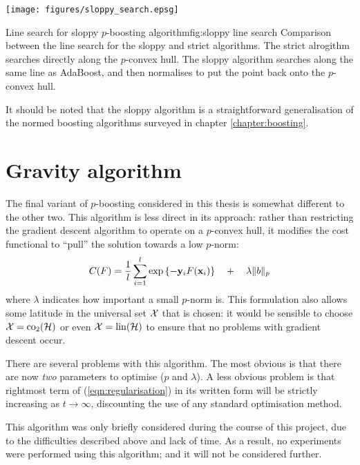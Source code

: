 \begin{linefigure}
\begin{center}
\texttt{[image: figures/sloppy\_search.epsg]}
\end{center}
\begin{capt}{Line search for sloppy $p$-boosting algorithm}{fig:sloppy line search}
Comparison between the line search for the sloppy and strict
algorithms.  The strict alrogithm searches directly along the
$p$-convex hull.  The sloppy algorithm searches along the same line as
AdaBoost, and then normalises to put the point back onto the
$p$-convex hull.
\end{capt}
\end{linefigure}

It should be noted that the sloppy algorithm is a straightforward
generalisation of the normed boosting algorithms surveyed in chapter
\ref{chapter:boosting}.


\section{Gravity algorithm}

The final variant of $p$-boosting considered in this thesis is
somewhat different to the other two.  This algorithm is less direct in
its approach: rather than restricting the gradient descent algorithm
to operate on a $p$-convex hull, it modifies the cost functional to
``pull'' the solution towards a low $p$-norm:
%
\begin{equation}
C(F) = \frac{1}{l} \sum_{i=1}^{l} \exp
\left\{ -\mathbf{y}_iF(\mathbf{x}_i) \right\} \quad + \quad \lambda \|b\|_p
\label{eqn:regularisation}
\end{equation}
%
where $\lambda$ indicates how important a small $p$-norm is.  This
formulation also allows some latitude in the universal set $\mathcal{X}$
that is chosen: it would be sensible to choose $\mathcal{X} = \mathrm{co}_2(\mathcal{H})$
or even $\mathcal{X} = \mathrm{lin}(\mathcal{H})$ to ensure that no problems with gradient
descent occur.

There are several problems with this algorithm.  The most obvious is that
there are now \emph{two} parameters to optimise ($p$ and $\lambda$).
A less obvious problem is that rightmost term of
(\ref{eqn:regularisation}) in its written form will be strictly
increasing as $t \rightarrow \infty$, discounting the use of any
standard optimisation method.

This algorithm was only briefly considered during the course of this
project, due to the difficulties described above and lack of time.  As
a result, no experiments were performed using this algorithm; and it
will not be considered further.





